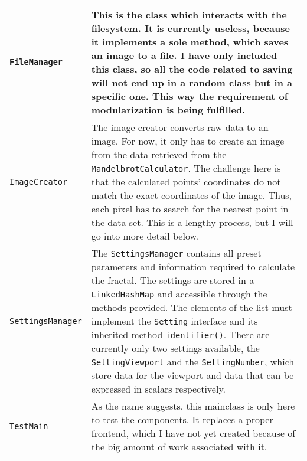 \documentclass[10pt,a4paper,titlepage]{article}
\begin{document}
\begin{table}[h!]
\begin{tabular}{p{}|p{}}
			\hline
			\verb|FileManager|& This is the class which interacts with the filesystem. It is currently useless, because it implements a sole method, which saves an image to a file. I have only included this class, so all the code related to saving will not end up in a random class but in a specific one. This way the requirement of modularization is being fulfilled. \\ 
			\hline
			\verb|ImageCreator|& The image creator converts raw data to an image. For now, it only has to create an image from the data retrieved from the \verb|MandelbrotCalculator|. The challenge here is that the calculated points' coordinates do not match the exact coordinates of the image. Thus, each pixel has to search for the nearest point in the data set. This is a lengthy process, but I will go into more detail below. \\ 
			\hline 
			\verb|SettingsManager|& The \verb|SettingsManager| contains all preset parameters and information required to calculate the fractal. The settings are stored in a \verb|LinkedHashMap| and accessible through the methods provided. The elements of the list must implement the \verb|Setting| interface and its inherited method \verb|identifier()|. There are currently only two settings available, the \verb|SettingViewport| and the \verb|SettingNumber|, which store data for the viewport and data that can be expressed in scalars respectively. \\ 
			\hline 
			\verb|TestMain|& As the name suggests, this mainclass is only here to test the components. It replaces a proper frontend, which I have not yet created because of the big amount of work associated with it. \\ 
		\end{tabular} 
	\end{table}
\end{document}
